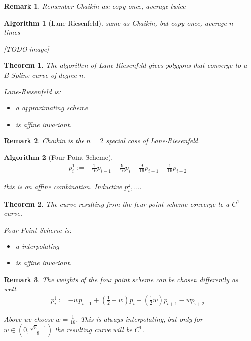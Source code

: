 \documentclass[]{article}
\newtheorem{theorem}{Theorem}
\newtheorem{algorithm}{Algorithm}
\newtheorem{remark}{Remark}
\begin{document}
\begin{remark}
	Remember Chaikin as: copy once, average twice
\end{remark}

\begin{algorithm}[Lane-Riesenfeld]
	same as Chaikin, but copy once, average $n$ times
	
	[TODO image]
\end{algorithm}

\begin{theorem}
	The algorithm of Lane-Riesenfeld gives polygons that converge to a B-Spline curve of degree $n$.
	
	Lane-Riesenfeld is:
	\begin{itemize}
		\item a approximating scheme
		\item is affine invariant.
	\end{itemize}
\end{theorem}

\begin{remark}
	Chaikin is the $n=2$ special case of Lane-Riesenfeld.
\end{remark}

\begin{algorithm}[Four-Point-Scheme]
	\begin{align*}
		p_i^1 := -\frac{1}{16} p_{i-1} + \frac{9}{16} p_i + \frac{9}{16} p_{i+1} - \frac{1}{16} p_{i+2}
	\end{align*}
	
	this is an affine combination. Inductive $p_i^2, ...$.
\end{algorithm}

\begin{theorem}
	The curve resulting from the four point scheme converge to a $C^1$ curve.
	
	Four Point Scheme is:
	\begin{itemize}
		\item a interpolating
		\item is affine invariant.
	\end{itemize}
\end{theorem}

\begin{remark}
	The weights of the four point scheme can be chosen differently as well:
	\begin{align*}
		p_i^1 := -w p_{i-1} + (\frac{1}{2} + w) p_i + (\frac{1}{2} w) p_{i+1} - w p_{i+2}
	\end{align*}
	
	Above we choose $w=\frac{1}{16}$. This is always interpolating, but only for $w \in (0, \frac{\sqrt{5} - 1}{8})$ the resulting curve will be $C^1$.
\end{remark}
\end{document}

